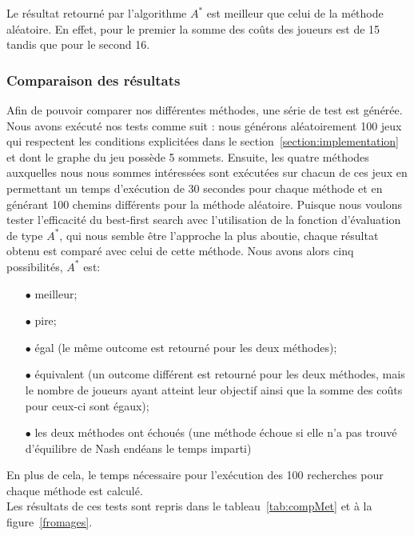 Le résultat retourné par l'algorithme $A^*$ est meilleur que celui de la méthode aléatoire. En effet, pour le premier la somme des coûts des joueurs est de 15 tandis que pour le second 16. 

\subsubsection*{Comparaison des résultats}

Afin de pouvoir comparer nos différentes méthodes, une série de test est générée. Nous avons exécuté nos tests comme suit : nous générons aléatoirement 100 jeux qui respectent les conditions explicitées dans le section~\ref{section:implementation} et dont le graphe du jeu possède 5 sommets. Ensuite, les quatre méthodes auxquelles nous nous sommes intéressées sont exécutées sur chacun de ces jeux en permettant un temps d'exécution de 30 secondes pour chaque méthode et en générant 100 chemins différents pour la méthode aléatoire. Puisque nous voulons tester l'efficacité du best-first search avec l'utilisation de la fonction d'évaluation de type $A^*$, qui nous semble être l'approche la plus aboutie, chaque résultat obtenu est comparé avec celui de cette méthode. Nous avons alors cinq possibilités, $A^*$ est:
\begin{itemize}
	\item[$\bullet$] meilleur;
	\item[$\bullet$] pire;
	\item[$\bullet$] égal (le même outcome est retourné pour les deux méthodes);
	\item[$\bullet$] équivalent (un outcome différent est retourné pour les deux méthodes, mais le nombre de joueurs ayant atteint leur objectif ainsi que la somme des coûts pour ceux-ci sont égaux);
	\item[$\bullet$] les deux méthodes ont échoués (une méthode échoue si elle n'a pas trouvé d'équilibre de Nash endéans le temps imparti)
\end{itemize}

En plus de cela, le temps nécessaire pour l'exécution des 100 recherches pour chaque méthode est calculé.\\
Les résultats de ces tests sont repris dans le tableau~\ref{tab:compMet} et à la figure~\ref{fromages}.

